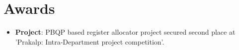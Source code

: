 \documentclass[letterpaper,11pt]{article}
\newcommand{\resumeSubHeadingListStart}{\begin{itemize}[leftmargin=*]}
\newcommand{\resumeSubHeadingListEnd}{\end{itemize}}
\begin{document}
%
\section{Awards}
  \resumeSubHeadingListStart
    \item{
      \textbf{Project}{: PBQP based register allocator project secured second place at 'Prakalp: Intra-Department project competition'.}
      \hfill
    }
  \resumeSubHeadingListEnd
\end{document}
